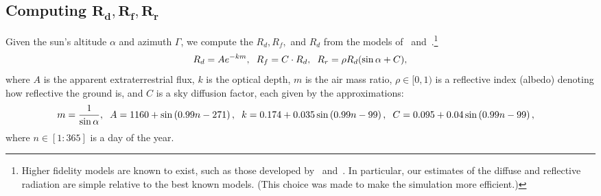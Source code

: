 \documentclass{article}
\begin{document}
\subsection{Computing $\pmb{R_d, R_f, R_r}$}
Given the sun's altitude $\alpha$ and azimuth $\Gamma$, we compute the $R_d, R_f,$ and $R_d$ from the models of~\citet{threlkeld1957direct,Liu1960} and~\citet{masters2013renewable}.\footnote{Higher fidelity models are known to exist, such as those developed by~\citet{andersen1980comments,klein1977calculation} and~\citet{kamali2006estimating}. In particular, our estimates of the diffuse and reflective radiation are simple relative to the best known models. (This choice was made to make the simulation more efficient.)}
\begin{align}
R_d = A e^{-km}, \hspace{2mm} R_f = C \cdot R_d, \hspace{2mm} R_r = \rho R_d (\sin \alpha + C),
\end{align}
where $A$ is the apparent extraterrestrial flux, $k$ is the optical depth, $m$ is the air mass ratio, $\rho \in [0,1)$ is a reflective index (albedo) denoting how reflective the ground is, and $C$ is a sky diffusion factor, each given by the approximations:
\begin{align}
m&=\frac{1}{\sin \alpha}, \hspace{2mm} A = 1160 + \sin \left(0.99 n- 271\right), \hspace{2mm} k =0.174 + 0.035 \sin\left( 0.99 n - 99\right), \hspace{2mm} C=0.095 + 0.04 \sin\left(0.99 n-99\right),
\end{align}
where $n \in [1:365]$ is a day of the year.

\end{document}
